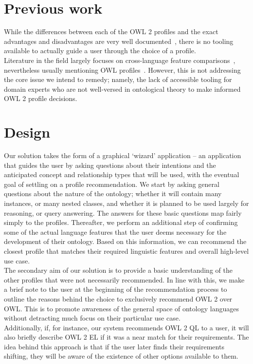 \documentclass[a4paper,titlepage,11pt]{scrartcl}
\begin{document}
\section{Previous work}
While the differences between each of the OWL 2 profiles and the exact advantages and disadvantages are very well documented~\cite{w3owl2profiles}, there is no tooling available to actually guide a user through the choice of a profile.\\

Literature in the field largely focuses on cross-language feature comparisons~\cite{funkysurvey}, nevertheless usually mentioning OWL profiles~\cite{oelanguagesurvey}. However, this is not addressing the core issue we intend to remedy; namely, the lack of accessible tooling for domain experts who are not well-versed in ontological theory to make informed OWL 2 profile decisions.

\section{Design}
Our solution takes the form of a graphical `wizard' application \--- an application that guides the user by asking questions about their intentions and the anticipated concept and relationship types that will be used, with the eventual goal of settling on a profile recommendation. We start by asking general questions about the nature of the ontology; whether it will contain many instances, or many nested classes, and whether it is planned to be used largely for reasoning, or query answering. The answers for these basic questions map fairly simply to the profiles. Thereafter, we perform an additional step of confirming some of the actual language features that the user deems necessary for the development of their ontology. Based on this information, we can recommend the closest profile that matches their required linguistic features and overall high-level use case. \\

The secondary aim of our solution is to provide a basic understanding of the other profiles that were not necessarily recommended. In line with this, we make a brief note to the user at the beginning of the recommendation process to outline the reasons behind the choice to exclusively recommend OWL 2 over OWL. This is to promote awareness of the general space of ontology languages without detracting much focus on their particular use case.\\

Additionally, if, for instance, our system recommends OWL 2 QL to a user, it will also briefly describe OWL 2 EL if it was a near match for their requirements. The idea behind this approach is that if the user later finds their requirements shifting, they will be aware of the existence of other options available to them.\\
\end{document}
